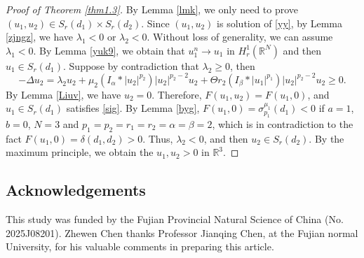 \documentclass[reqno]{amsart}
\begin{document}
\begin{proof}[Proof of Theorem \ref{thm1.3}]
By Lemma \ref{lmk}, we only need to prove $(u_1,u_2)\in S_r(d_1)\times S_r(d_2)$. 
Since $(u_1,u_2)$ is solution of \eqref{yy}, by Lemma \ref{zjngz}, we have 
$\lambda_1<0$ or $\lambda_2<0$. Without loss of generality, we can assume 
$\lambda_1<0$. By Lemma \ref{yuk9},
we obtain that $u_1^n\to  u_1$ in $H_r^1(\mathbb{R}^N)$ and then $u_1\in S_r(d_1)$. 
Suppose by contradiction that $\lambda_2\geq0$, then
\[
 -\Delta u_2=\lambda_2 u_2+\mu_2(I_\alpha\ast|u_2|^{p_2})|u_2|^{p_2-2}u_2+
 \Theta r_2(I_\beta\ast|u_1|^{p_1})|u_2|^{p_2-2}u_2\geq0.
\]
By Lemma \ref{Liuv}, we have $u_2=0$. Therefore, $F(u_1,u_2)=F(u_1,0)$, and
$u_1\in S_r(d_1)$ satisfies \eqref{sig}.
By Lemma \ref{byg}, $F(u_1,0)=\sigma_{p_1}^{\mu_1}(d_1)<0$ if $a=1$,
$b=0$, $N=3$ and $p_1=p_2=r_1=r_2=\alpha=\beta=2$, which is in contradiction to the
fact $F(u_1,0)=\delta(d_1,d_2)>0$. Thus, $\lambda_2<0$, and then $u_2\in S_r(d_2)$.
By the maximum principle, we obtain the $u_1,u_2>0$ in $\mathbb{R}^3$.
\end{proof}

\subsection*{Acknowledgements}
This study was funded by the Fujian Provincial Natural Science
of China (No. 2025J08201).
Zhewen Chen thanks Professor Jianqing Chen, at the Fujian normal University, 
for his valuable comments in preparing this article.
\end{document}
